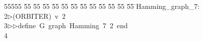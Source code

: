 %
%
\begin{tabbing}
55555 \= 55 \= 55 \= 55 \= 55 \= 55 \= 55 \= 55 \= 55 \= 55 \= 55 \= 55 \= 55 \= \>Hamming\_graph\_7:\\[0pt]
2\>$\triangleright$\>(ORBITER)\ v\ 2\ \\[0pt]
3\>$\triangleright$\>$\triangleright$\>define\ G\ graph\ Hamming\ 7\ 2\ end\\[0pt]
4\>\end{tabbing}
